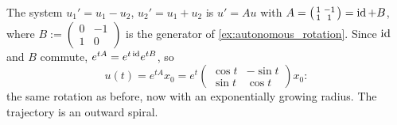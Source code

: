 \begin{example}
\label{ex:autonomous_spiral}
The system $u_1'=u_1-u_2$, $u_2'=u_1+u_2$ is $u'=Au$ with
$A = \left(\begin{smallmatrix}1&-1\\1&1\end{smallmatrix}\right) = \operatorname{id} + B$, where
$B := \left(\begin{smallmatrix}0&-1\\1&0\end{smallmatrix}\right)$ is the generator of
\cref{ex:autonomous_rotation}. Since $\operatorname{id}$ and $B$ commute, $e^{tA}=e^{t\operatorname{id}}e^{tB}$, so
\[u(t) = e^{tA}x_0 = e^t\begin{pmatrix}\cos t & -\sin t\\ \sin t & \cos t\end{pmatrix}x_0:\]
the same rotation as before, now with an exponentially growing radius. The trajectory is an
outward spiral.
\begin{center}
\end{center}
\end{example}

